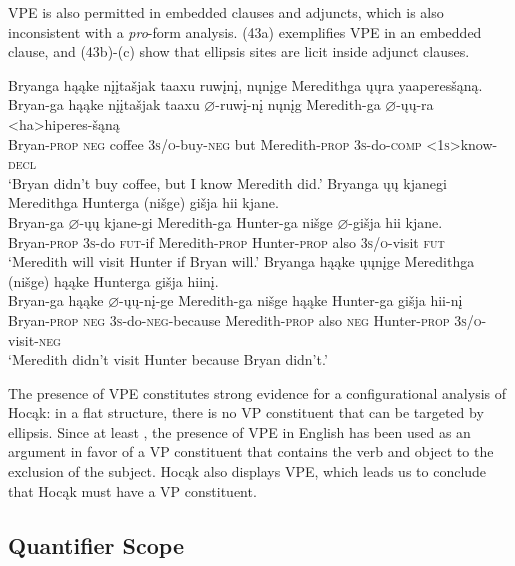 \documentclass[output=paper]{LSP/langsci}
\begin{document}
VPE is also permitted in embedded clauses and adjuncts, which is also inconsistent with a \textit{pro}-form analysis. (43a) exemplifies VPE in an embedded clause, and (43b)-(c) show that ellipsis sites are licit inside adjunct clauses.

\ea\label{ex:jrs:43}
\ea
\glll Bryanga	hąąke	{n\k{i}\k{i}ta\v{s}jak taaxu}		ruw\k{i}n\k{i},		n\k{u}n\k{i}ge		Meredithga \k{u}\k{u}ra 	yaaperes\v{s}ąną. \\
Bryan-ga hąąke	{n\k{i}\k{i}ta\v{s}jak taaxu} $\varnothing$-ruw\k{i}-n\k{i} n\k{u}n\k{i}g	Meredith-ga $\varnothing$-\k{u}\k{u}-ra	<ha>hiperes-\v{s}ąną \\
Bryan-\textsc{prop}	\textsc{neg}	coffee	 \textsc{3s/o}-buy-\textsc{neg} but	 Meredith-\textsc{prop} \textsc{3s}-do-\textsc{comp}	\textsc{<1s>}know-\textsc{decl} \\
\trans `Bryan didn't buy coffee, but I know Meredith did.'
\ex 
\glll Bryanga	\k{u}\k{u}	kjanegi	Meredithga	Hunterga	(ni\v{s}ge)	 {gi\v{s}ja hii} kjane.\\
Bryan-ga	$\varnothing$-\k{u}\k{u}  kjane-gi	 Meredith-ga	Hunter-ga	ni\v{s}ge  {$\varnothing$-gi\v{s}ja hii} kjane. \\
Bryan-\textsc{prop} \textsc{3s}-do	\textsc{fut}-if	 Meredith-\textsc{prop} Hunter-\textsc{prop}	 also	 \textsc{3s/o}-visit	 \textsc{fut} \\
\trans `Meredith will visit Hunter if Bryan will.'
\ex 
\glll Bryanga			hąąke	\k{u}\k{u}n\k{i}ge	Meredithga		(ni\v{s}ge)		hąąke Hunterga	{gi\v{s}ja hiin\k{i}.}\\
Bryan-ga	hąąke	$\varnothing$-\k{u}\k{u}-n\k{i}-ge	Meredith-ga	 ni\v{s}ge	hąąke  Hunter-ga  {gi\v{s}ja hii-n\k{i}} \\
Bryan-\textsc{prop}	\textsc{neg}	\textsc{3s}-do-\textsc{neg}-because Meredith-\textsc{prop} also	\textsc{neg} Hunter-\textsc{prop} \textsc{3s/o}-visit-\textsc{neg} \\
\trans `Meredith didn't visit Hunter because Bryan didn't.'
\z
\z

The presence of VPE constitutes strong evidence for a configurational analysis of Hocąk: in a flat structure, there is no VP constituent that can be targeted by ellipsis. Since at least \citet{Ross1969}, the presence of VPE in English has been used as an argument in favor of a VP constituent that contains the verb and object to the exclusion of the subject. Hocąk also displays VPE, which leads us to conclude that Hocąk must have a VP constituent.

\subsection{Quantifier Scope}
\end{document}
